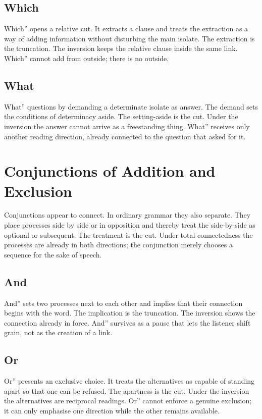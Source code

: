 \documentclass[11pt,a4paper]{article}
\begin{document}
\subsection{Which} Which'' opens a relative cut. It extracts a clause and treats the extraction as a way of adding information without disturbing the main isolate. The extraction is the truncation. The inversion keeps the relative clause inside the same link. Which'' cannot add from outside; there is no outside.

\subsection{What} What'' questions by demanding a determinate isolate as answer. The demand sets the conditions of determinacy aside. The setting-aside is the cut. Under the inversion the answer cannot arrive as a freestanding thing. What'' receives only another reading direction, already connected to the question that asked for it.

\section{Conjunctions of Addition and Exclusion}

Conjunctions appear to connect. In ordinary grammar they also separate. They place processes side by side or in opposition and thereby treat the side-by-side as optional or subsequent. The treatment is the cut. Under total connectedness the processes are already in both directions; the conjunction merely chooses a sequence for the sake of speech.

\subsection{And} And'' sets two processes next to each other and implies that their connection begins with the word. The implication is the truncation. The inversion shows the connection already in force. And'' survives as a pause that lets the listener shift grain, not as the creation of a link.

\subsection{Or} Or'' presents an exclusive choice. It treats the alternatives as capable of standing apart so that one can be refused. The apartness is the cut. Under the inversion the alternatives are reciprocal readings. Or'' cannot enforce a genuine exclusion; it can only emphasise one direction while the other remains available.
\end{document}
